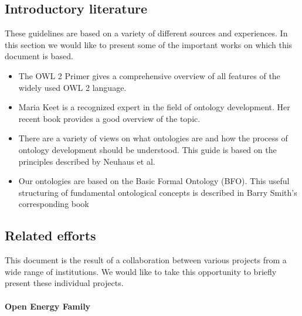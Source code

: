 \subsection{Introductory literature}


These guidelines are based on a variety of different sources and experiences. In this section we would like to present some of the important works on which this document is based.


\begin{itemize}
    \item The OWL 2 Primer gives a comprehensive overview of all features of the widely used OWL 2 language. \cite{owlprimer}
    \item Maria Keet is a recognized expert in the field of ontology development. Her recent book provides a good overview of the topic. \cite{keet2018introduction}
    \item There are a variety of views on what ontologies are and how the process of ontology development should be understood. This guide is based on the principles described by Neuhaus et al. \cite{Neuhaus2022OntologyDI, neuhaus2018ontology}
    \item Our ontologies are based on the Basic Formal Ontology (BFO). This useful structuring of fundamental ontological concepts is described in Barry Smith's corresponding book \cite{bfo-book}
\end{itemize}

\subsection{Related efforts}

This document is the result of a collaboration between various projects from a wide range of institutions. We would like to take this opportunity to briefly present these individual projects.

\paragraph{Open Energy Family}

